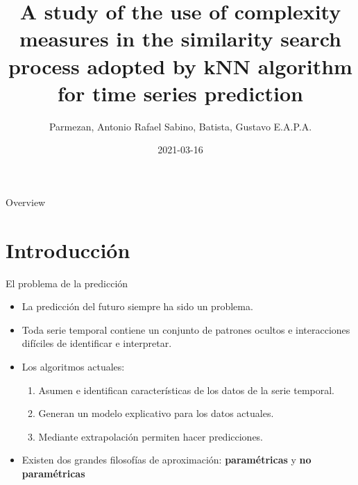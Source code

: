\documentclass[12pt, aspectratio=169]{beamer} %
\title{A study of the use of complexity measures in the similarity search process adopted by kNN algorithm for time series prediction}
\author{Parmezan, Antonio Rafael Sabino, Batista, Gustavo E.A.P.A.}
\date{2021-03-16}
\begin{document}
\frame{\titlepage}


\begin{frame}{Overview}
\tableofcontents
\end{frame}

\section{Introducción}

\begin{frame}{El problema de la predicción}
  \begin{itemize}
  \item La predicción del futuro siempre ha sido un problema.
  \item Toda serie temporal contiene un conjunto de patrones ocultos e interacciones difíciles de identificar e interpretar.
  \item Los algoritmos actuales:
    \begin{enumerate}
    \item Asumen e identifican características de los datos de la serie temporal.
    \item Generan un modelo explicativo para los datos actuales.
    \item Mediante extrapolación permiten hacer predicciones.
    \end{enumerate}
  \item Existen dos grandes filosofías de aproximación: \textbf{paramétricas} y \textbf{no paramétricas}
  \end{itemize}
\end{frame}
\end{document}
